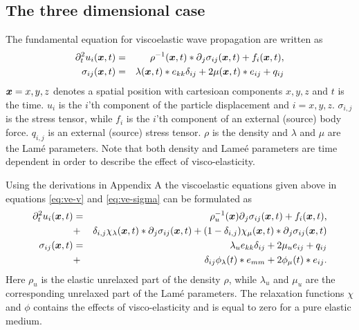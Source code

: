 \documentclass[11pt]{article}
\begin{document}
\subsection{The three dimensional case}
The fundamental equation for viscoelastic wave propagation are written as
\cite{Hudson1985}
\begin{eqnarray}
  \partial^2_t{u_i(\mbox{\boldmath $x$}, t)} & = & \rho^{-1}(\mbox{\boldmath $x$},t)*\mbox{$\partial$}_j \sigma_{ij}(\mbox{\boldmath $x$}, t) 
                                               +f_i(\mbox{\boldmath $x$},t),     \nonumber\\
					   \label{eq:ve-v}
  \sigma_{ij}(\mbox{\boldmath $x$}, t) & = & 
                            \lambda(\mbox{\boldmath $x$},t)* e_{kk}\delta_{ij} + 2\mu(\mbox{\boldmath $x$},t)* e_{ij} 
                                               +q_{ij}          \nonumber\\
					  \label{eq:ve-sigma}
\end{eqnarray}
$\mbox{\boldmath $x$}=x,y,z$ denotes a spatial position with cartesioan components $x,y,z$ and $t$ is
the time.
$u_i$ is the $i$'th component of the particle
displacement and $i=x,y,z$. $\sigma_{i,j}$ is the stress tensor, while
$f_i$ is the $i$'th component of an external (source) body force. 
$q_{i,j}$ is an external (source) stress tensor.
$\rho$ is the density and $\lambda$ and $\mu$ are the Lam\'{e} parameters.
Note that both density and Lame\'{e} parameters are time dependent in order
to describe the effect of visco-elasticity.

Using the derivations in Appendix A the viscoelastic equations given
above in equations \eqref{eq:ve-v} and \eqref{eq:ve-sigma}
can be formulated as
\begin{eqnarray}
  \partial^2_t{u_i(\mbox{\boldmath $x$}, t)} 
              & = & \rho^{-1}_u(\mbox{\boldmath $x$})\mbox{$\partial$}_j \sigma_{ij}(\mbox{\boldmath $x$}, t) 
                                           +f_i(\mbox{\boldmath $x$},t),     \nonumber\\
              & + & \delta_{i,j}\chi_{\lambda}(\mbox{\boldmath $x$},t)*\mbox{$\partial$}_j \sigma_{ij}(\mbox{\boldmath $x$}, t)
                + (1-\delta_{i,j})\chi_{\mu}(\mbox{\boldmath $x$},t)*\mbox{$\partial$}_j\sigma_{ij}(\mbox{\boldmath $x$},t) \\
					   \label{eq:v}
  \sigma_{ij}(\mbox{\boldmath $x$}, t) & = & 
                            \lambda_u e_{kk}\delta_{ij} + 2\mu_u e_{ij} 
                                               +q_{ij}          \nonumber\\
                      & + & \delta_{ij}\phi_{\lambda}(t)*e_{mm} 
                                         +2\phi_{\mu}(t)*e_{ij}.
					  \label{eq:sigma}
\end{eqnarray}
Here $\rho_u$ is the elastic unrelaxed part of the density $\rho$, 
while $\lambda_u$ and $\mu_u$ are the corresponding unrelaxed part
of the Lam\'{e} parameters. The relaxation functions $\chi$ and $\phi$ contains
the effects of visco-elasticity and is equal to zero for a pure elastic medium.
\end{document}
